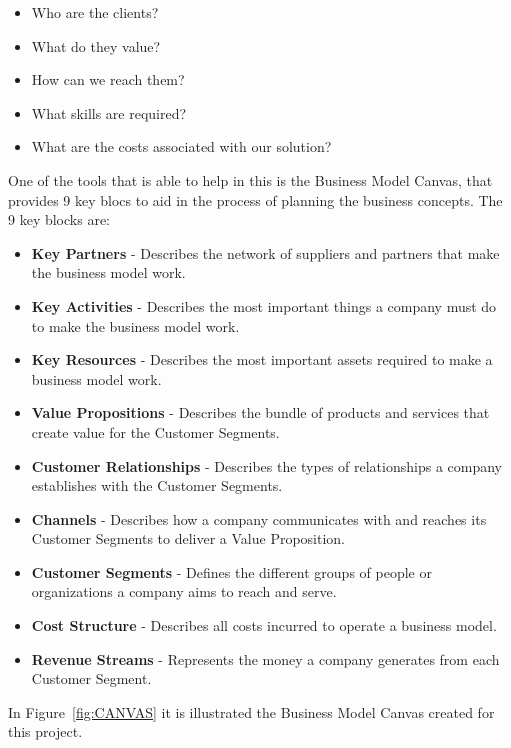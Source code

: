 \begin{itemize}
        \item Who are the clients?
        \item What do they value?
        \item How can we reach them?
        \item What skills are required?
        \item What are the costs associated with our solution?
\end{itemize}

One of the tools that is able to help in this is the Business Model Canvas\cite{osterwalder2010business}, that provides 9 key blocs to aid in the process of planning the business concepts.
The 9 key blocks are:

\begin{itemize}
    \item \textbf{Key Partners} - Describes the network of suppliers and partners that make the business model work.
    \item \textbf{Key Activities} - Describes the most important things a company must do to make the business model work.
    \item \textbf{Key Resources} - Describes the most important assets required to make a business model work.
    \item \textbf{Value Propositions} - Describes the bundle of products and services that create value for the Customer Segments.
    \item \textbf{Customer Relationships} - Describes the types of relationships a company establishes with the Customer Segments.
    \item \textbf{Channels} - Describes how a company communicates with and reaches its Customer Segments to deliver a Value Proposition.
    \item \textbf{Customer Segments} - Defines the different groups of people or organizations a company aims to reach and serve.
    \item \textbf{Cost Structure} - Describes all costs incurred to operate a business model.
    \item \textbf{Revenue Streams} - Represents the money a company generates from each Customer Segment.
\end{itemize}

In Figure~\ref{fig:CANVAS} it is illustrated the Business Model Canvas created for this project.

